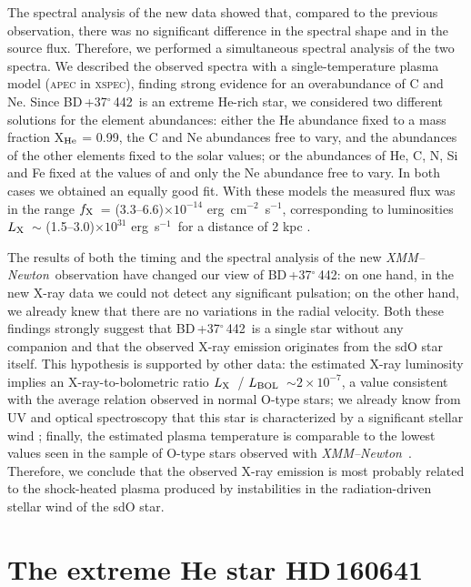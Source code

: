 \documentclass[USenglish,twocolumn]{article}
\def\XMM{{\em XMM--Newton}}
\def\BDone{BD\,+37$^\circ$\,442}
\def\HDtwo{HD\,160641}
\def\flux {\mbox{erg cm$^{-2}$ s$^{-1}$}}
\def\lum {\mbox{erg s$^{-1}$}}
\def\lx {$L_{\rm X}$}
\def\fx {$f_{\rm X}$}
\def\lbol {$L_{\rm BOL}$}
\begin{document}
The spectral analysis of the new data showed that, compared to the previous observation, there was no significant difference in the spectral shape and in the source flux. Therefore, we performed a simultaneous spectral analysis of the two spectra. We described the observed spectra with a single-temperature plasma model (\textsc{apec} in \textsc{xspec}), finding strong evidence for an overabundance of C and Ne. Since \BDone\ is an extreme He-rich star, we considered two different solutions for the element abundances: either the He abundance fixed to a mass fraction X$_{\rm He}$ = 0.99, the C and Ne abundances free to vary, and the abundances of the other elements fixed to the solar values; or the abundances of He, C, N, Si and Fe fixed at the values of \citet{JefferyHamann10} and only the Ne abundance free to vary. In both cases we obtained an equally good fit. With these models the measured flux was in the range \fx\ = (3.3--6.6)$\times 10^{-14}$ \flux, corresponding to luminosities \lx\ $\sim$ (1.5--3.0)$\times 10^{31}$ \lum\ for a distance of 2 kpc \citep{BauerHusfeld95}.

The results of both the timing and the spectral analysis of the new \XMM\ observation have changed our view of \BDone: on one hand, in the new X-ray data we could not detect any significant pulsation; on the other hand, we already knew that there are no variations in the radial velocity. Both these findings strongly suggest that \BDone\ is a single star without any companion and that the observed X-ray emission originates from the sdO star itself. This hypothesis is supported by other data: the estimated X-ray luminosity implies an X-ray-to-bolometric ratio \lx\ / \lbol\ $\sim 2\times10^{-7}$, a value consistent with the average relation observed in normal O-type stars; we already know from UV and optical spectroscopy that this star is characterized by a significant stellar wind \citep{JefferyHamann10}; finally, the estimated plasma temperature is comparable to the lowest values seen in the sample of O-type stars observed with \XMM\ \citep{Naze09}. Therefore, we conclude that the observed X-ray emission is most probably related to the shock-heated plasma produced by instabilities in the radiation-driven stellar wind of the sdO star.

\section{The extreme He star \HDtwo}
\end{document}
